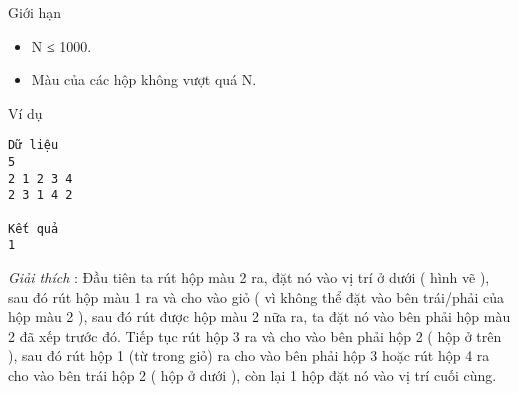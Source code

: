 Giới hạn
\begin{itemize}
	\item     N ≤ 1000.   
	\item     Màu của các hộp không vượt quá N.   
\end{itemize}
Ví dụ
\begin{verbatim}
Dữ liệu
5
2 1 2 3 4
2 3 1 4 2

Kết quả
1
\end{verbatim}

\textit{    Giải thích   }   : Đầu tiên ta rút hộp màu 2 ra, đặt nó vào vị   trí ở dưới ( hình vẽ ), sau đó rút hộp màu 1 ra và cho vào giỏ ( vì không thể đặt vào bên trái/phải của hộp màu 2 ), sau đó rút được hộp màu 2 nữa ra, ta đặt nó vào bên phải hộp màu 2 đã xếp trước đó. Tiếp tục rút hộp 3 ra và cho vào bên phải hộp 2 ( hộp ở trên ), sau đó rút hộp 1 (từ trong giỏ) ra cho vào bên phải hộp 3 hoặc rút hộp 4 ra cho vào bên trái hộp 2 ( hộp ở dưới ), còn lại 1 hộp đặt nó vào vị trí cuối cùng.